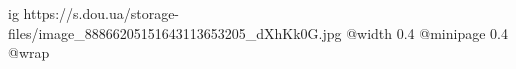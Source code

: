  
 
 
 
 

\ifcmt
  ig https://s.dou.ua/storage-files/image_88866205151643113653205_dXhKk0G.jpg
  @width 0.4
  @minipage 0.4
  @wrap \parpic[r]
\fi

